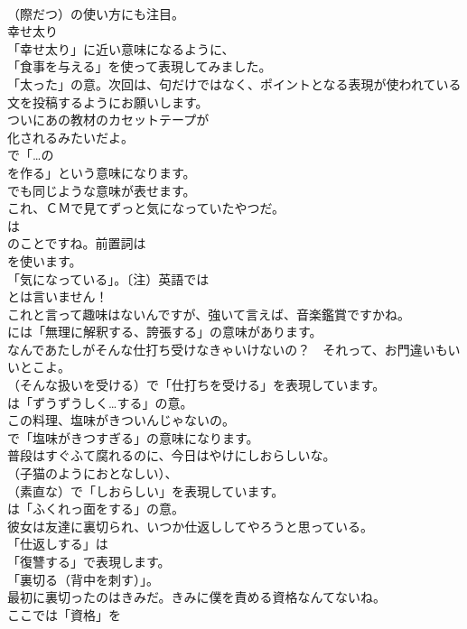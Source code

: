 \documentclass[8pt]{extreport}
\begin{document}
\begin{CJK}{UTF8}{min}
\\	（際だつ）の使い方にも注目。	
\\	幸せ太り 
\\	「幸せ太り」に近い意味になるように、
\\	「食事を与える」を使って表現してみました。
\\	「太った」の意。次回は、句だけではなく、ポイントとなる表現が使われている文を投稿するようにお願いします。	
\\	ついにあの教材のカセットテープが
\\	化されるみたいだよ。 
\\	で「…の
\\	を作る」という意味になります。
\\	でも同じような意味が表せます。	
\\	これ、ＣＭで見てずっと気になっていたやつだ。 
\\	は
\\	のことですね。前置詞は
\\	を使います。
\\	「気になっている」。〔注）英語では
\\	とは言いません！	
\\	これと言って趣味はないんですが、強いて言えば、音楽鑑賞ですかね。 
\\	には「無理に解釈する、誇張する」の意味があります。	
\\	なんであたしがそんな仕打ち受けなきゃいけないの？　それって、お門違いもいいとこよ。 
\\	（そんな扱いを受ける）で「仕打ちを受ける」を表現しています。
\\	は「ずうずうしく…する」の意。	
\\	この料理、塩味がきついんじゃないの。 
\\	で「塩味がきつすぎる」の意味になります。	
\\	普段はすぐふて腐れるのに、今日はやけにしおらしいな。 
\\	（子猫のようにおとなしい）、
\\	（素直な）で「しおらしい」を表現しています。
\\	は「ふくれっ面をする」の意。	
\\	彼女は友達に裏切られ、いつか仕返ししてやろうと思っている。 
\\	「仕返しする」は
\\	「復讐する」で表現します。
\\	「裏切る（背中を刺す）」。	
\\	最初に裏切ったのはきみだ。きみに僕を責める資格なんてないね。 
\\	ここでは「資格」を 

\end{CJK}
\end{document}
